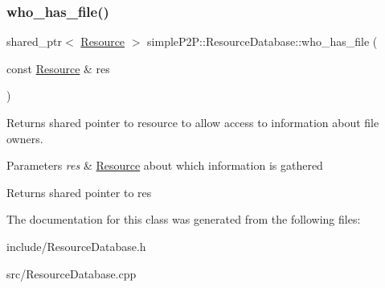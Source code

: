 \subsubsection{\texorpdfstring{who\+\_\+has\+\_\+file()}{who\_has\_file()}\hspace{0.1cm}{\footnotesize\ttfamily [2/2]}}
{\footnotesize\ttfamily shared\+\_\+ptr$<$ \hyperlink{classsimpleP2P_1_1Resource}{Resource} $>$ simple\+P2\+P\+::\+Resource\+Database\+::who\+\_\+has\+\_\+file (\begin{DoxyParamCaption}\item[{const \hyperlink{classsimpleP2P_1_1Resource}{Resource} \&}]{res }\end{DoxyParamCaption})}



Returns shared pointer to resource to allow access to information about file owners. 


\begin{DoxyParams}{Parameters}
{\em res} & \hyperlink{classsimpleP2P_1_1Resource}{Resource} about which information is gathered \\
\hline
\end{DoxyParams}
\begin{DoxyReturn}{Returns}
shared pointer to res 
\end{DoxyReturn}


The documentation for this class was generated from the following files\+:\begin{DoxyCompactItemize}
\item 
include/Resource\+Database.\+h\item 
src/Resource\+Database.\+cpp\end{DoxyCompactItemize}
